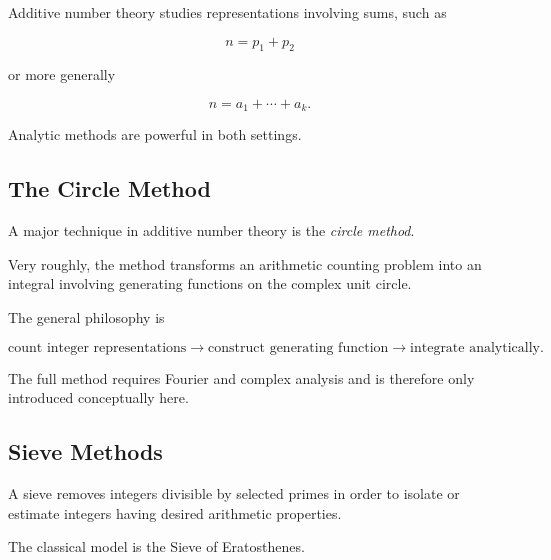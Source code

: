 Additive number theory studies representations involving sums, such as

\[ n=p_1+p_2 \]

or more generally

\[ n=a_1+\cdots+a_k. \]

Analytic methods are powerful in both settings.

\subsection{The Circle Method}
\label{subsec:circle-method-introduction}

A major technique in additive number theory is the \emph{circle method}.

Very roughly, the method transforms an arithmetic counting problem into an
integral involving generating functions on the complex unit circle.

The general philosophy is

\[
\boxed{
\text{count integer representations}
\longrightarrow
\text{construct generating function}
\longrightarrow
\text{integrate analytically}.
}
\]

The full method requires Fourier and complex analysis and is therefore only
introduced conceptually here.

\subsection{Sieve Methods}
\label{subsec:sieve-methods-introduction}

A sieve removes integers divisible by selected primes in order to isolate or
estimate integers having desired arithmetic properties.

The classical model is the Sieve of Eratosthenes.

\begin{centereddiagram}
\end{centereddiagram}

